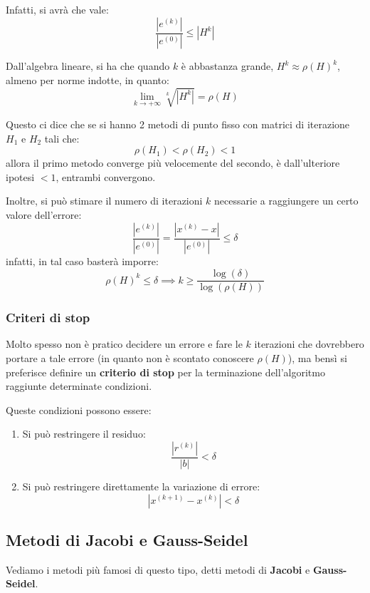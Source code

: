 \documentclass[a4paper,11pt]{article}
\begin{document}
Infatti, si avrà che vale:
$$
\frac{|e^{(k)}|}{|e^{(0)}|} \leq | H^k |
$$

Dall'algebra lineare, si ha che quando $k$ è abbastanza grande, $H^k \approx \rho(H)^k$, almeno per norme indotte, in quanto:
$$
\lim_{k \rightarrow +\infty} \sqrt[k]{|H^k|} = \rho(H)
$$

Questo ci dice che se si hanno 2 metodi di punto fisso con matrici di iterazione $H_1$ e $H_2$ tali che:
$$
\rho(H_1) < \rho(H_2) < 1
$$
allora il primo metodo converge più velocemente del secondo, è dall'ulteriore ipotesi $<1$, entrambi convergono.

Inoltre, si può stimare il numero di iterazioni $k$ necessarie a raggiungere un certo valore dell'errore:
$$
\frac{ | e^{(k)} | }{ | e^{(0)} | } = \frac{ | x^{(k)} - x | }{ | e^{(0)} | } \leq \delta 
$$
infatti, in tal caso basterà imporre:
$$
\rho(H)^k \leq \delta \implies k \geq \frac{ \log(\delta) }{\log( \rho(H) )}
$$

\subsubsection{Criteri di stop}
Molto spesso non è pratico decidere un errore e fare le $k$ iterazioni che dovrebbero portare a tale errore (in quanto non è scontato conoscere $\rho(H)$), ma bensì si preferisce definire un \textbf{criterio di stop} per la terminazione dell'algoritmo raggiunte determinate condizioni.

Queste condizioni possono essere:
\begin{enumerate}
	\item Si può restringere il residuo:
		$$
			\frac{ | r^{(k)} | }{ | b | } < \delta	
		$$
	\item Si può restringere direttamente la variazione di errore:
		$$
			| x^{(k + 1)} - x^{(k)} | < \delta	
		$$
\end{enumerate}

\subsection{Metodi di Jacobi e Gauss-Seidel}
Vediamo i metodi più famosi di questo tipo, detti metodi di \textbf{Jacobi} e \textbf{Gauss-Seidel}.
\end{document}

